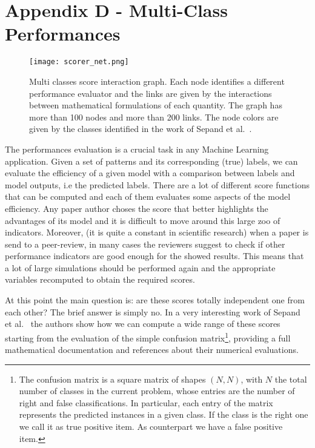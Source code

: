 \documentclass{standalone}
\begin{document}
\chapter*{Appendix D - Multi-Class Performances}

\begin{center}
\begin{figure}[htbp]
\centering
\texttt{[image: scorer\_net.png]}
\caption{Multi classes score interaction graph.
Each node identifies a different performance evaluator and the links are given by the interactions between mathematical formulations of each quantity.
The graph has more than 100 nodes and more than 200 links.
The node colors are given by the classes identified in the work of Sepand et al.~\cite{PyCM}.
}
\label{fig:scorer_net}
\end{figure}
\end{center}

The performances evaluation is a crucial task in any Machine Learning application.
Given a set of patterns and its corresponding (true) labels, we can evaluate the efficiency of a given model with a comparison between labels and model outputs, i.e the predicted labels.
There are a lot of different score functions that can be computed and each of them evaluates some aspects of the model efficiency.
Any paper author choses the score that better highlights the advantages of its model and it is difficult to move around this large zoo of indicators.
Moreover, (it is quite a constant in scientific research) when a paper is send to a peer-review, in many cases the reviewers suggest to check if other performance indicators are good enough for the showed results.
This means that a lot of large simulations should be performed again and the appropriate variables recomputed to obtain the required scores.

At this point the main question is: are these scores totally independent one from each other?
The brief answer is simply no.
In a very interesting work of Sepand et al.~\cite{PyCM} the authors show how we can compute a wide range of these scores starting from the evaluation of the simple confusion matrix\footnote{
  The confusion matrix is a square matrix of shapes $(N, N)$, with $N$ the total number of classes in the current problem, whose entries are the number of right and false classifications.
  In particular, each entry of the matrix represents the predicted instances in a given class.
  If the class is the right one we call it as true positive item.
  As counterpart we have a false positive item.
}, providing a full mathematical documentation and references about their numerical evaluations.
\end{document}
